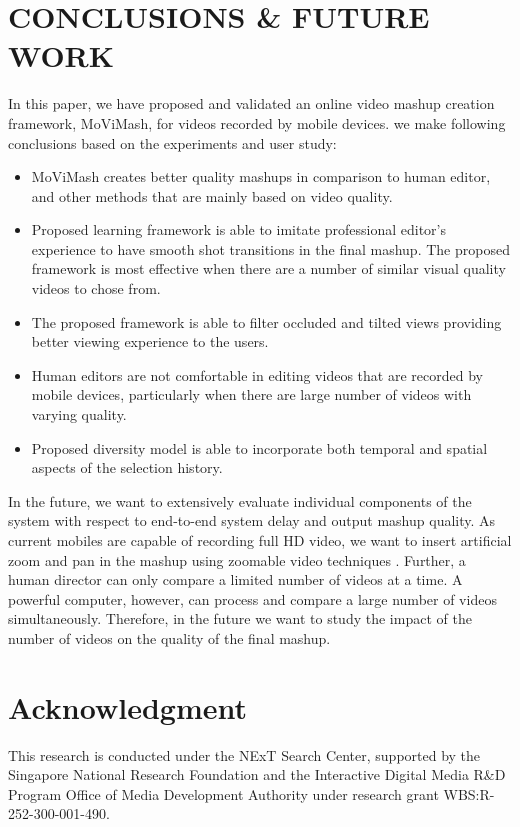 \documentclass{sig-alternate}
\begin{document}
    \section{CONCLUSIONS \& FUTURE WORK}
    In this paper, we have proposed and validated an online video mashup creation framework, MoViMash, for videos recorded by mobile devices. we make following conclusions based on the experiments and user study:
    \begin{itemize}
        \item MoViMash creates better quality mashups in comparison to human editor, and other methods that are mainly based on video quality.
        \item Proposed learning framework is able to imitate professional editor’s experience to have smooth shot transitions in the final mashup. The proposed framework is most effective when there are a number of similar visual quality videos to chose from.
        \item The proposed framework is able to filter occluded and tilted views providing better viewing experience to the users.
        \item Human editors are not comfortable in editing videos that are recorded by mobile devices, particularly when there are large number of videos with varying quality.
        \item Proposed diversity model is able to incorporate both temporal and spatial aspects of the selection history.
    \end{itemize}
    In the future, we want to extensively evaluate individual components of the system with respect to end-to-end system delay and output mashup quality. As current mobiles are capable of recording full HD video, we want to insert artificial zoom and pan in the mashup using zoomable video techniques \cite{11}. Further, a human director can only compare a limited number of videos at a time. A powerful computer, however, can process and compare a large number of videos simultaneously. Therefore, in the future we want to study the impact of the number of videos on the quality of the final mashup.
    
    \section*{Acknowledgment}
    This research is conducted under the NExT Search Center, supported by the Singapore National Research Foundation and the Interactive Digital Media R\&D Program Office of Media Development Authority under research grant WBS:R-252-300-001-490.
    
    
     
    
\end{document}
